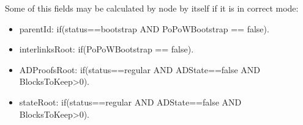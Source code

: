 \vspace{1em}
Some of this fields may be calculated by node by itself if it is in correct mode:

\begin{itemize}
    \item parentId: if(status==bootstrap AND PoPoWBootstrap == false).
    \item interlinksRoot: if(PoPoWBootstrap == false).
    \item ADProofsRoot: if(status==regular AND ADState==false AND BlocksToKeep>0).
    \item stateRoot: if(status==regular AND ADState==false AND BlocksToKeep>0).
\end{itemize}
